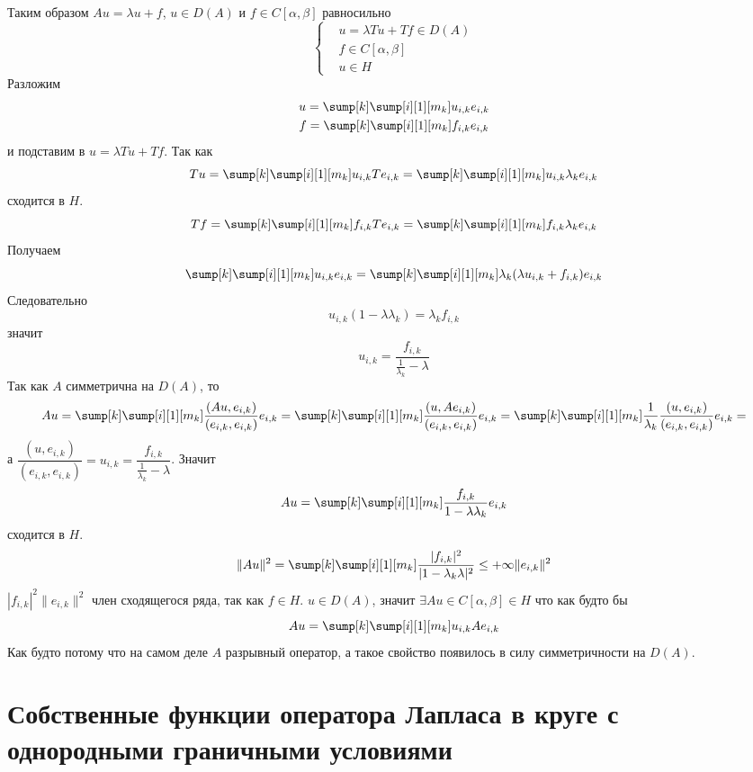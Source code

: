 \documentclass[14pt]{extarticle}
\begin{document}
\begin{Proof}
    Таким образом $Au = \lambda u + f$, $u \in D(A)$  и $f \in C[\alpha, \beta]$ равносильно
    $$
    \left\{
    \begin{aligned}
        &u = \lambda T u  + T f \in D(A)\\
        &f \in C[\alpha, \beta]\\
        &u \in H
    \end{aligned}
    \right.
    $$
    Разложим
    \begin{gather*}
    u = \sump[k]\sump[i][1][m_k]u_{i,k}e_{i,k}\\
    f  = \sump[k]\sump[i][1][m_k]f_{i,k}e_{i,k}
    \end{gather*}
    и подставим в $u = \lambda T u + T f$.
    Так как
    $$
    Tu = \sump[k]\sump[i][1][m_k]u_{i,k} T e_{i,k} = \sump[k]\sump[i][1][m_k]u_{i,k} 
    \lambda_ke_{i,k}
    $$
    сходится в $H$.
    $$
    Tf = \sump[k]\sump[i][1][m_k]f_{i,k} T e_{i,k} = \sump[k]\sump[i][1][m_k]f_{i,k} 
    \lambda_ke_{i,k}
    $$
    Получаем
    $$
    \sump[k]\sump[i][1][m_k]u_{i,k}e_{i,k} = \sump[k]\sump[i][1][m_k] \lambda_k
    (\lambda u_{i,k} + f_{i,k})e_{i,k}
    $$
    Следовательно
    $$
    u_{i,k}(1 - \lambda \lambda_k) = \lambda_k f_{i,k}
    $$
    значит
    $$
    u_{i,k} = \dfrac{f_{i,k}}{\frac{1}{\lambda_k} - \lambda}
    $$
    Так как $A$ симметрична на $D(A)$, то
    $$
    Au = \sump[k]\sump[i][1][m_k]\dfrac{(Au, e_{i,k})}{(e_{i,k}, e_{i,k})}e_{i,k} = 
    \sump[k]\sump[i][1][m_k]\dfrac{(u, Ae_{i,k})}{(e_{i,k}, e_{i,k})}e_{i,k} =
    \sump[k]\sump[i][1][m_k]\dfrac{1}{\lambda_k}\dfrac{(u, e_{i,k})}{(e_{i,k}, e_{i,k})}e_{i,k} = 
    $$
    а $\dfrac{(u, e_{i,k})}{(e_{i,k}, e_{i,k})} = u_{i,k} = \dfrac{f_{i,k}}{\frac{1}{\lambda_k} - \lambda}$.
    Значит
    $$
    A u =  \sump[k]\sump[i][1][m_k]\dfrac{f_{i,k}}{1 - \lambda \lambda_k}e_{i,k}
    $$
    сходится в $H$.
    $$
    \|Au\|^2 =  \sump[k]\sump[i][1][m_k]\dfrac{|f_{i,k}|^2}{|1 - \lambda_k \lambda|^2} \le +\infty
    \|e_{i,k}\|^2
    $$
    $|f_{i,k}|^2\|e_{i,k}\|^2$ член сходящегося ряда, так как $f \in H$.
    $u \in D(A)$, значит $\exists Au \in C[\alpha, \beta] \in H$ что как будто бы
    $$
    Au =  \sump[k]\sump[i][1][m_k] u_{i,k}Ae_{i,k}
    $$
    Как будто потому что на самом деле $A$ разрывный оператор, а такое свойство 
    появилось в силу симметричности на $D(A)$.
\end{Proof}
\section*{Собственные функции оператора Лапласа в круге с однородными 
граничными условиями} 
\end{document}
